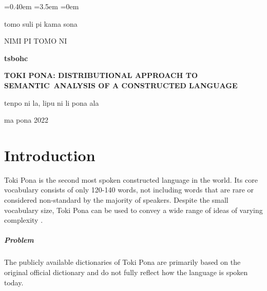 \documentclass[14pt, a4paper]{extreport}
\begin{document}
\sloppy
{}\font=0.40em %
\font=3.5em %
\font=0em %

\renewcommand{\contentsname}{\let\clearpage\relax\chapter*{Contents}} %


\begin{titlepage}
  \begin{center}
    tomo suli pi kama sona

    NIMI PI TOMO NI

    \vfill

    \textbf{tsbohc}

    \large
    \textbf{TOKI PONA: DISTRIBUTIONAL APPROACH TO SEMANTIC~ANALYSIS OF A CONSTRUCTED LANGUAGE}

    \normalsize

    \bigskip
    \bigskip
    \bigskip
    \bigskip
    tenpo ni la, lipu ni li pona ala

    \bigskip


    \vfill
    ma pona 2022

  \end{center}
\end{titlepage}
\setcounter{page}{2}
\restoregeometry
\tableofcontents

\chapter{Introduction}

Toki Pona is the second most spoken constructed language in the world. Its core vocabulary consists of only 120-140 words, not including words that are rare or considered non-standard by the majority of speakers. Despite the small vocabulary size, Toki Pona can be used to convey a wide range of ideas of varying complexity \parencite{iso}.
\paragraph{Problem}
The publicly available dictionaries of Toki Pona are primarily based on the original official dictionary \parencite[125-134]{pu} and do not fully reflect how the language is spoken today.
\end{document}
